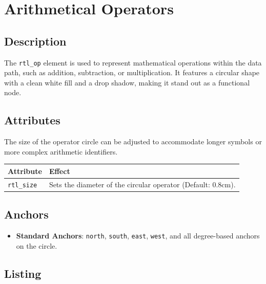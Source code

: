 \section{\sffamily Arithmetical Operators}

    \subsection{\sffamily Description}
        The \texttt{rtl\_op} element is used to represent mathematical operations within the data path, such as addition, subtraction, or multiplication. It features a circular shape with a clean white fill and a drop shadow, making it stand out as a functional node.
        
    \subsection{\sffamily Attributes}
        The size of the operator circle can be adjusted to accommodate longer symbols or more complex arithmetic identifiers.

    \begin{center}
        \begin{tabular}{lp{8cm}}
        \toprule
            \textbf{Attribute} & \textbf{Effect} \\
            \midrule
            \texttt{rtl\_size} & Sets the diameter of the circular operator (Default: 0.8cm). \\
            \bottomrule
        \end{tabular}
    \end{center}

    \subsection{\sffamily Anchors}
        \begin{itemize}
            \item \textbf{Standard Anchors}: \texttt{north}, \texttt{south}, \texttt{east}, \texttt{west}, and all degree-based anchors on the circle.
        \end{itemize}

    \subsection{\sffamily Listing}
\begin{RTLexample}
\end{RTLexample}

